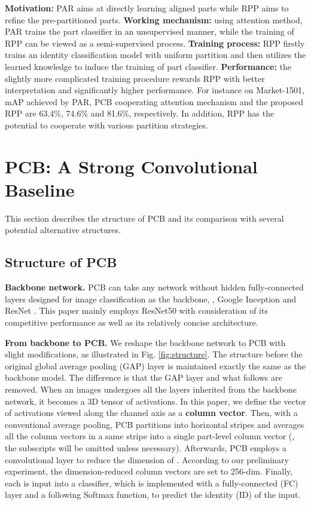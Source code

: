 \documentclass[10pt,twocolumn,letterpaper]{article}
\begin{document}
\textbf{Motivation:} PAR aims at directly learning aligned parts while RPP aims to refine the pre-partitioned parts. \textbf{Working mechanism:} using attention method, PAR trains the part classifier in an unsupervised manner, while the training of RPP can be viewed as a semi-supervised process. \textbf{Training process:} RPP firstly trains an identity classification model with uniform partition and then utilizes the learned knowledge to induce the training of part classifier. \textbf{Performance:} the slightly more complicated training procedure rewards RPP with better interpretation and significantly higher performance. For instance on Market-1501, mAP achieved by PAR, PCB cooperating attention mechanism and the proposed RPP are 63.4\%, 74.6\% and 81.6\%, respectively. In addition, RPP has the potential to cooperate with various partition strategies. 

\section{PCB: A Strong Convolutional Baseline}\label{sec:network}
This section describes the structure of PCB and its comparison with several potential alternative structures.

\subsection{Structure of PCB}
\textbf{Backbone network.} PCB can take any network without hidden fully-connected layers designed for image classification as the backbone, \eg, Google Inception \cite{Szegedy2016Inception} and ResNet \cite{DBLP:conf/cvpr/HeZRS16}. 
This paper mainly employs ResNet50 with consideration of its competitive performance as well as its relatively concise architecture. 


\textbf{From backbone to PCB.} We reshape the backbone network to PCB with slight modifications, as illustrated in Fig. \ref{fig:structure}. The structure before the original global average pooling  (GAP) layer is maintained exactly the same as the backbone model. The difference is that the GAP layer and what follows are removed. When an images undergoes all the layers inherited from the backbone network, it becomes a 3D tensor \bm{} of activations. In this paper, we define the vector of activations viewed along the channel axis as a \textbf{column vector}. 
Then, with a conventional average pooling, PCB partitions \bm{} into  horizontal stripes and averages all the column vectors in a same stripe into a single part-level column vector  (, the subscripts will be omitted unless necessary). Afterwards, PCB employs a convolutional layer to reduce the dimension of . According to our preliminary experiment, the dimension-reduced column vectors  are set to 256-dim. Finally, each  is input into a classifier, which is implemented with a fully-connected (FC) layer and a following Softmax function, to predict the identity (ID) of the input. 
\end{document}
